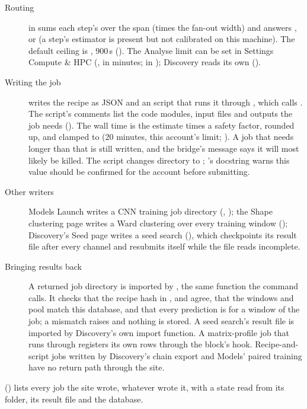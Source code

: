 \begin{description}
\item[Routing]  in  sums each step's
   over the span (times the fan-out width) and answers ,
   or  (a step's estimator is present but not calibrated on this
  machine). The default ceiling is , 900\,s
  (). The Analyse limit can be set in Settings \textrightarrow{} Compute \&
  HPC (, in minutes;  in );
  Discovery reads its own  ().
\item[Writing the job]  writes the recipe as JSON and an  script that
  runs it through , which calls . The
  script's comments list the code modules, input files and outputs the job needs
  (). The wall time is the estimate times a safety factor, rounded up, and
  clamped to  (20 minutes, this account's limit;
  ). A job that needs longer than that is still written, and the
  bridge's message says it will most likely be killed. The script changes directory to
  ; 's docstring warns this value should be
  confirmed for the account before submitting.
\item[Other writers] Models \textrightarrow{} Launch writes a CNN training job directory
  (, ); the Shape clustering page writes a
  Ward clustering over every training window (); Discovery's Seed
  page writes a seed search (), which checkpoints its result file
  after every channel and resubmits itself while the file reads incomplete.
\item[Bringing results back] A returned job directory is imported by
  , the same function the command
   calls. It checks that the recipe hash in
  ,  and  agree, that the windows and pool match
  this database, and that every prediction is for a window of the job; a mismatch raises
   and nothing is stored. A seed search's result file is imported by Discovery's
  own import function. A matrix-profile job that runs through  registers its own
  rows through the block's  hook. Recipe-and-script jobs written by Discovery's chain
  export and Models' paired training have no return path through the site.
\end{description}

 () lists every job the site wrote,
whatever wrote it, with a state read from its folder, its result file and the database.
